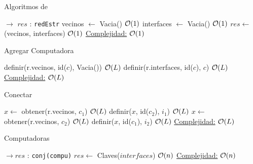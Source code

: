 \begin{Algoritmos}


\begin{algorithm}
  \caption{Algoritmos de }
\begin{algorithmic}[1]
   $\to$ $res$ : \texttt{redEstr}
  \State vecinos $\gets$ Vacia() \Comment $\mathcal{O}(1)$
  \State interfaces $\gets$ Vacia() \Comment $\mathcal{O}(1)$
  \State $res \gets$ (vecinos, interfaces) \Comment $\mathcal{O}(1)$
  \EndProcedure
  \underline{Complejidad:} $\mathcal{O}(1)$
\end{algorithmic}
\end{algorithm}


\begin{algorithm}
\caption{Agregar Computadora}
\begin{algorithmic}[1]
  \State definir(r.vecinos, id($c$), Vacia()) \Comment $\mathcal{O}(L)$
  \State definir(r.interfaces, id($c$), $c$) \Comment $\mathcal{O}(L)$
 \EndProcedure
 \underline{Complejidad:} $\mathcal{O}(L)$
\end{algorithmic}
\end{algorithm}


\begin{algorithm}
\caption{Conectar}
\begin{algorithmic}[1]
  \State $x \gets$ obtener(r.vecinos, $c_1$) \Comment $\mathcal{O}(L)$
  \State definir($x$, id($c_2$), $i_1$) \Comment $\mathcal{O}(L)$
  \State $x \gets$ obtener(r.vecinos, $c_2$) \Comment $\mathcal{O}(L)$
  \State definir($x$, id($c_1$), $i_2$) \Comment $\mathcal{O}(L)$
 \EndProcedure
 \underline{Complejidad:} $\mathcal{O}(L)$
\end{algorithmic}
\end{algorithm}



\begin{algorithm}
\caption{Computadoras}
\begin{algorithmic}[1]
   $\to res$ : \texttt{conj(compu)} 
  \State $res \gets$ Claves($interfaces$) \Comment $\mathcal{O}(n)$
 \EndProcedure
\underline{Complejidad:} $\mathcal{O}(n)$
\end{algorithmic}
\end{algorithm}



\end{Algoritmos}
